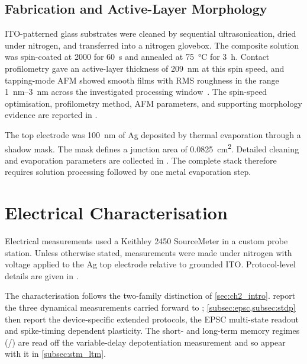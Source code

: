 \documentclass[12pt, twoside]{report}
\begin{document}
\subsection{Fabrication and Active-Layer Morphology}\label{subsec:fabrication_morphology}

ITO-patterned glass substrates were cleaned by sequential ultrasonication, dried under nitrogen, and transferred into a nitrogen glovebox. The composite solution was spin-coated at \SI{2000}{\rpm} for \SI{60}{\second} and annealed at \SI{75}{\celsius} for \SI{3}{\hour}. Contact profilometry gave an active-layer thickness of \SI{209}{\nano\metre} at this spin speed, and tapping-mode AFM showed smooth films with RMS roughness in the range \SIrange{1}{3}{\nano\metre} across the investigated processing window~\cite{PradoSocorro2022}. The spin-speed optimisation, profilometry method, AFM parameters, and supporting morphology evidence are reported in .

The top electrode was \SI{100}{\nano\metre} of Ag deposited by thermal evaporation through a shadow mask. The mask defines a junction area of \SI{0.0825}{\square\centi\metre}. Detailed cleaning and evaporation parameters are collected in . The complete stack therefore requires solution processing followed by one metal evaporation step.


\section{Electrical Characterisation}\label{sec:elec_char}

Electrical measurements used a Keithley 2450 SourceMeter in a custom probe station. Unless otherwise stated, measurements were made under nitrogen with voltage applied to the Ag top electrode relative to grounded ITO. Protocol-level details are given in .

The characterisation follows the two-family distinction of \cref{sec:ch2_intro}.  report the three dynamical measurements carried forward to ; \cref{subsec:epsc,subsec:stdp} then report the device-specific extended protocols, the EPSC multi-state readout and spike-timing dependent plasticity. The short- and long-term memory regimes (\STM{}/\LTM{}) are read off the variable-delay depotentiation measurement and so appear with it in \cref{subsec:stm_ltm}.
\end{document}
